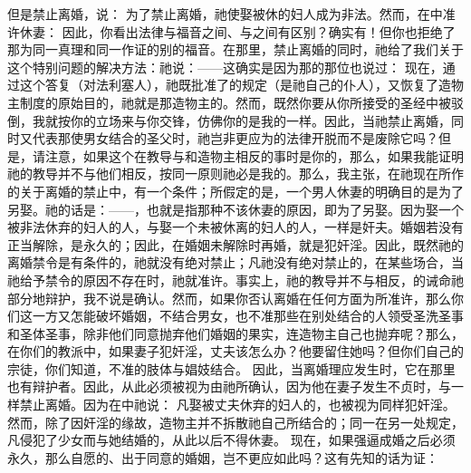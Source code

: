 但是禁止离婚，说： 为了禁止离婚，祂使娶被休的妇人成为非法。然而，在中准许休妻： 因此，你看出法律与福音之间、与之间有区别？确实有！但你也拒绝了那为同一真理和同一作证的别的福音。在那里，禁止离婚的同时，祂给了我们关于这个特别问题的解决方法：祂说：——这确实是因为那的那位也说过： 现在，通过这个答复（对法利塞人），祂既批准了的规定（是祂自己的仆人），又恢复了造物主制度的原始目的，祂就是那造物主的。然而，既然你要从你所接受的圣经中被驳倒，我就按你的立场来与你交锋，仿佛你的是我的一样。因此，当祂禁止离婚，同时又代表那使男女结合的圣父时，祂岂非更应为的法律开脱而不是废除它吗？但是，请注意，如果这个在教导与和造物主相反的事时是你的，那么，如果我能证明祂的教导并不与他们相反，按同一原则祂必是我的。那么，我主张，在祂现在所作的关于离婚的禁止中，有一个条件；所假定的是，一个男人休妻的明确目的是为了另娶。祂的话是：——，也就是指那种不该休妻的原因，即为了另娶。因为娶一个被非法休弃的妇人的人，与娶一个未被休离的妇人的人，一样是奸夫。婚姻若没有正当解除，是永久的；因此，在婚姻未解除时再婚，就是犯奸淫。因此，既然祂的离婚禁令是有条件的，祂就没有绝对禁止；凡祂没有绝对禁止的，在某些场合，当祂给予禁令的原因不存在时，祂就准许。事实上，祂的教导并不与相反，的诫命祂部分地辩护，我不说是确认。然而，如果你否认离婚在任何方面为所准许，那么你们这一方又怎能破坏婚姻，不结合男女，也不准那些在别处结合的人领受圣洗圣事和圣体圣事，除非他们同意抛弃他们婚姻的果实，连造物主自己也抛弃呢？那么，在你们的教派中，如果妻子犯奸淫，丈夫该怎么办？他要留住她吗？但你们自己的宗徒，你们知道，不准的肢体与娼妓结合。 因此，当离婚理应发生时，它在那里也有辩护者。因此，从此必须被视为由祂所确认，因为他在妻子发生不贞时，与一样禁止离婚。因为在中祂说： 凡娶被丈夫休弃的妇人的，也被视为同样犯奸淫。 然而，除了因奸淫的缘故，造物主并不拆散祂自己所结合的；同一在另一处规定，凡侵犯了少女而与她结婚的，从此以后不得休妻。 现在，如果强逼成婚之后必须永久，那么自愿的、出于同意的婚姻，岂不更应如此吗？这有先知的话为证： 